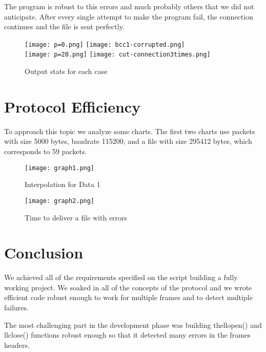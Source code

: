 \documentclass[main.tex]{subfiles}
\begin{document}
The program is robust to this errors and much probably others that we did not anticipate.
After every single attempt to make the program fail, the connection continues and the file is sent perfectly.

\begin{figure}[htbp]
\centering
\texttt{[image: p=0.png]}
\texttt{[image: bcc1-corrupted.png]}\\
\medskip
\texttt{[image: p=20.png]}
\texttt{[image: cut-connection3times.png]}
\caption{Output stats for each case}
\label{fig:example}
\end{figure}

\section{Protocol Efficiency}
\label{sec:pefficiency}

To approach this topic we analyze some charts.
The first two charts use packets with size 5000 bytes, baudrate 115200, and a file with size 295412 bytes, which corresponds to 59 packets. 

\begin{figure}[htbp]
\begin{minipage}{0.48\textwidth}
\centering
\texttt{[image: graph1.png]}
\caption{Interpolation for Data 1}
\label{Fig:Data1}
\end{minipage}\hfill
\begin{minipage}{0.48\textwidth}
\centering
\texttt{[image: graph2.png]}
\caption{Time to deliver a file with errors}
\label{Fig:Data2}
\end{minipage}
\end{figure}

\section{Conclusion}
\label{sec:conclusion}

We achieved all of the requirements specified on the script building a fully working project. We soaked in all of the concepts of the protocol and we wrote efficient code robust enough to work for multiple frames and to detect multiple failures.

The most challenging part in the development phase was building thellopen() and llclose() functions robust enough so that it detected many errors in the frames headers.
\end{document}
